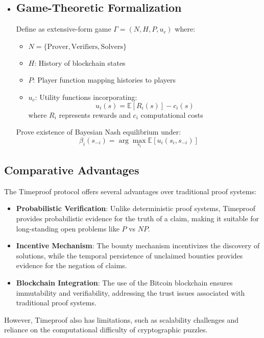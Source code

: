 \documentclass[12pt]{report}
\begin{document}
\begin{itemize}
    \item \subsection{Game-Theoretic Formalization}
    Define as extensive-form game $\Gamma = (N, H, P, u_c)$ where:
    \begin{itemize}
        \item $N = \{\text{Prover}, \text{Verifiers}, \text{Solvers}\}$
        \item $H$: History of blockchain states
        \item $P$: Player function mapping histories to players
        \item $u_c$: Utility functions incorporating:
        \begin{equation*}
            u_i(s) = \mathbb{E}[R_i(s)] - c_i(s)
        \end{equation*}
        where $R_i$ represents rewards and $c_i$ computational costs
    \end{itemize}
    Prove existence of Bayesian Nash equilibrium under:
    \begin{equation*}
        \beta_i(s_{-i}) = \arg\max_{s_i} \mathbb{E}[u_i(s_i, s_{-i})]
    \end{equation*}
\end{itemize}

\subsection{Comparative Advantages}
The Timeproof protocol offers several advantages over traditional proof systems:
\begin{itemize}
    \item \textbf{Probabilistic Verification}: Unlike deterministic proof systems, Timeproof provides probabilistic evidence for the truth of a claim, making it suitable for long-standing open problems like \( P \) vs \( NP \).
    \item \textbf{Incentive Mechanism}: The bounty mechanism incentivizes the discovery of solutions, while the temporal persistence of unclaimed bounties provides evidence for the negation of claims.
    \item \textbf{Blockchain Integration}: The use of the Bitcoin blockchain ensures immutability and verifiability, addressing the trust issues associated with traditional proof systems.
\end{itemize}
However, Timeproof also has limitations, such as scalability challenges and reliance on the computational difficulty of cryptographic puzzles.
\end{document}
